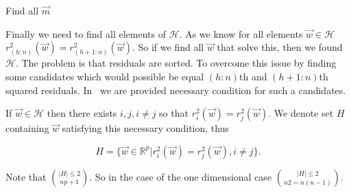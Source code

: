 \begin{algorithm}[H]
    \label{find:all:m}

      \caption{Find all $\vec{m}$}


      

    \;
\end{algorithm}


Finally we need to find all elements of $\mathcal{H}$. As we know for all elements $\vec{w} \in \mathcal{H}$ $r^{2}_{(h:n)}(\vec{w}) = r^{2}_{(h+1:n)}(\vec{w})$. So if we find all $\vec{w}$ that solve this, then we found $\mathcal{H}$. The problem is that residuals are sorted. To overcome this issue by finding some candidates which would possible be equal $(h:n)$th and $(h+1:n)$th squared residuals. In~\cite{klouda2015exact} we are provided necessary condition for such a candidates.

\begin{definition}
    If $\vec{w} \in \mathcal{H}$ then there exists $i,j, i \neq j$ so that
     $r^{2}_i(\vec{w}) = r^{2}_j(\vec{w})$. We denote set $H$ containing $\vec{w}$ satisfying this necessary condition, thus

    \begin{equation}
        H = \{{ \vec{w} \in \mathbb{R}^p | r^{2}_i(\vec{w}) = r^{2}_j(\vec{w}), i \neq j  \}}.   
    \end{equation}
     
\end{definition}

Note that $|H| \leq 2 \choose{n}{p+1}$. So in  the case of the one dimensional case $|H| \leq 2 \choose{n}{2} = n(n-1)$.

